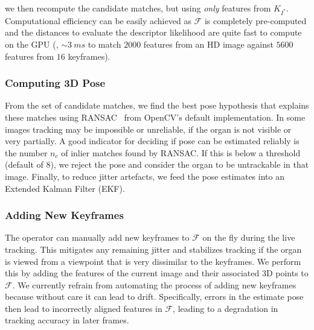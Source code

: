we then recompute the candidate matches, but using \emph{only} features from $K_{I^*}$.
Computational efficiency can be easily achieved as $\mathcal{F}$ is completely pre-computed and the distances to evaluate the descriptor likelihood are quite fast to compute on the GPU (\eg, $\sim\SI{3}{ms}$ to match $2000$ features from an HD image against $5600$ features from $16$ keyframes).

\subsubsection{Computing 3D Pose}
From the set of candidate matches, we find the best pose hypothesis that explains these  matches using   RANSAC~\cite{Fischler:1981:RSC:358669.358692} from OpenCV's default implementation.
In some images tracking may be impossible or unreliable, if the organ is not visible or very partially. A good indicator for deciding if pose can be estimated reliably is the number $n_c$ of inlier matches found by RANSAC. If this is below a threshold (default of $8$), we reject the pose and consider the organ to be untrackable in that image. Finally, to reduce jitter artefacts, we feed the pose estimates into an Extended Kalman Filter (EKF). 

\subsubsection{Adding New Keyframes}
The operator can manually add new keyframes to $\mathcal{F}$ on the fly during the live tracking.
This mitigates any remaining jitter and stabilizes tracking if the organ is viewed from a viewpoint that is very dissimilar to the keyframes.
We perform this by adding the features of the current image and their associated 3D points to $\mathcal{F}$.
We currently refrain from automating the process of adding new keyframes because without care it can lead to drift.
Specifically, errors in the estimate pose then lead to incorrectly aligned features in $\mathcal{F}$, leading to a degradation in tracking accuracy in later frames.

